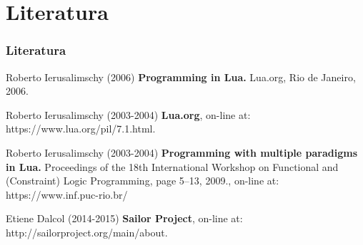 \documentclass{beamer}
\begin{document}

\section{Literatura}

\begin{frame}
\frametitle{Literatura}
\footnotesize{
\begin{thebibliography}{99}

 Roberto Ierusalimschy (2006)
\newblock \small{\textbf{Programming in Lua.} Lua.org, Rio de Janeiro, 2006.}

 Roberto Ierusalimschy (2003-2004)
\newblock \small{\textbf{Lua.org}, on-line at: https://www.lua.org/pil/7.1.html.}

 Roberto Ierusalimschy (2003-2004)
\newblock \small{\textbf{Programming with multiple paradigms in
Lua.} Proceedings of the 18th International Workshop on Functional
and (Constraint) Logic Programming, page 5–13, 2009.}, on-line at: https://www.inf.puc-rio.br/%

 Etiene Dalcol (2014-2015)
\newblock \small{\textbf{Sailor Project}, on-line at: http://sailorproject.org/main/about.}

\end{thebibliography}
}
\end{frame}
\end{document}
